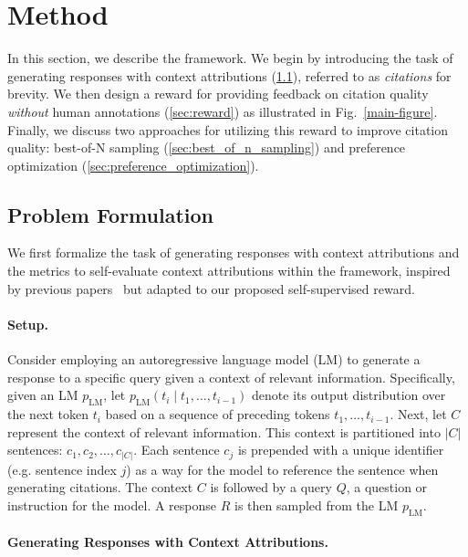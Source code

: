 \section{Method}
\label{method}

In this section, we describe the \ours framework.
We begin by introducing the task of generating responses with context attributions (\ref{sec:problem_formulation}), referred to as \emph{citations} for brevity.
We then design a reward for providing feedback on citation quality \emph{without} human annotations (\ref{sec:reward}) as illustrated in Fig.~\ref{main-figure}.
Finally, we discuss two approaches for utilizing this reward to improve citation quality: best-of-N sampling (\ref{sec:best_of_n_sampling}) and preference optimization (\ref{sec:preference_optimization}).

\subsection{Problem Formulation}
\label{sec:problem_formulation}

We first formalize the task of generating responses with context attributions and the metrics to self-evaluate context attributions within the \ours framework, inspired by previous papers~\citep{zhang2024longcite, cohen2024contextcite} but adapted to our proposed self-supervised reward.

\paragraph{Setup.} Consider employing an autoregressive language model (LM) to generate a response to a specific query given a context of relevant information. 
Specifically, given an LM $p_{\text{LM}}$, let $p_{\text{LM}}(t_i \mid t_1, \hdots, t_{i-1})$ denote its output distribution over the next token $t_i$ based on a sequence of preceding tokens $t_1,\hdots,t_{i-1}$.
Next, let $C$ represent the context of relevant information.
This context is partitioned into $|C|$ sentences: $c_1, c_2, \dots, c_{|C|}$.
Each sentence $c_j$ is prepended with a unique identifier (e.g. sentence index $j$) as a way for the model to reference the sentence when generating citations. 
The context $C$ is followed by a query $Q$, a question or instruction for the model.
A response $R$ is then sampled from the LM $p_\text{LM}$.

\paragraph{Generating Responses with Context Attributions.}

